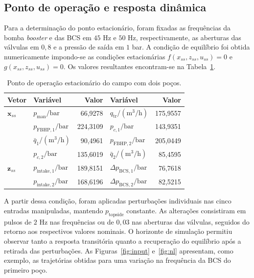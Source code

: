 \documentclass[10pt,a4paper]{article}
\newcommand{\mat}[1]{\mathbf{#1}}
\newcommand{\bcs}{\mathrm{BCS}}
\newcommand{\fbhp}{\mathrm{FBHP}}
\newcommand{\man}{\mathrm{man}}
\newcommand{\tr}{\mathrm{tr}}
\begin{document}
\subsection{Ponto de operação e resposta dinâmica}
Para a determinação do ponto estacionário, foram fixadas as frequências da bomba \textit{booster} e das BCS em $45$ Hz e $50$ Hz, respectivamente, as aberturas das válvulas em $0{,}8$ e a pressão de saída em $1$ bar. A condição de equilíbrio foi obtida numericamente impondo-se as condições estacionárias
$f(x_{ss},z_{ss},u_{ss})=0$ e
$g(x_{ss},z_{ss},u_{ss})=0$. Os valores resultantes encontram-se na Tabela~\ref{tab:ss}.

\begin{table}[htbp]\centering\small
\caption{Ponto de operação estacionário do campo com dois poços.}\label{tab:ss}
\begin{tabular}{@{}llrlr@{}}\toprule
Vetor & Variável & Valor & Variável & Valor\\\midrule
$\mat{x}_{ss}$ & $p_{\man}/\mathrm{bar}$ & 66,9278 & $q_{\tr}/(\mathrm{m}^3/\mathrm{h})$ & 175,9557\\
& $p_{\fbhp,1}/\mathrm{bar}$ & 224,3109 & $p_{c,1}/ \mathrm{bar}$ & 143,9351\\
& $\bar q_1/(\mathrm{m}^3/\mathrm{h})$ & 90,4961 & $p_{\fbhp,2}/ \mathrm{bar}$ & 205,0449\\
& $p_{c,2}/\mathrm{bar}$ & 135,6019 & $\bar q_2/(\mathrm{m}^3/ \mathrm{h})$ & 85,4595\\\midrule
$\mat{z}_{ss}$ & $p_{\mathrm{intake},1}/\mathrm{bar}$ & 189,8151 & $\Delta p_{\bcs,1}/ \mathrm{bar}$ & 76,7618\\
& $p_{\mathrm{intake},2}/\mathrm{bar}$ & 168,6196 & $\Delta p_{\bcs,2}/ \mathrm{bar}$ & 82,5215\\\bottomrule
\end{tabular}
\end{table}

A partir dessa condição, foram aplicadas perturbações individuais nas cinco entradas manipuladas, mantendo $p_{\mathrm{topside}}$ constante. As alterações consistiram em pulsos de $2$ Hz nas frequências ou de $0{,}03$ nas aberturas das válvulas, seguidos do retorno aos respectivos valores nominais. O horizonte de simulação permitiu observar tanto a resposta transitória quanto a recuperação do equilíbrio após a retirada das perturbações. As Figuras~\ref{fig:input} e~\ref{fig:nl} apresentam, como exemplo, as trajetórias obtidas para uma variação na frequência da BCS do primeiro poço.
\end{document}
